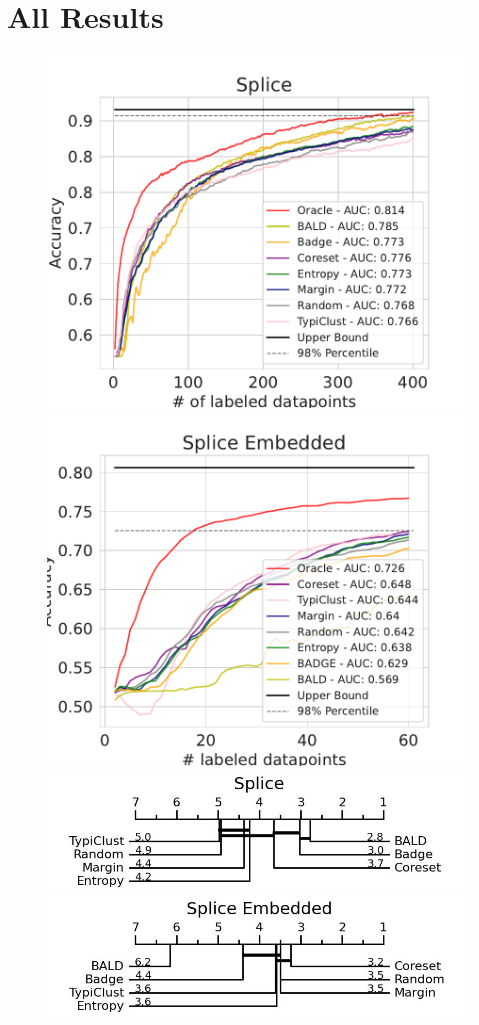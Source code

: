 \documentclass[]{article}
\begin{document}
\section{All Results}\label{app:all_results}
\begin{figure}[H]
	\centering
	\includegraphics[width=0.49\linewidth]{img/eval_splice}
	\includegraphics[width=0.49\linewidth]{img/eval_splice_enc} \\ [2mm]
	\includegraphics[width=0.49\linewidth]{img/micro_splice.jpg}
	\includegraphics[width=0.49\linewidth]{img/micro_splice_enc.jpg} \\ [4mm]
\end{figure}
\end{document}
